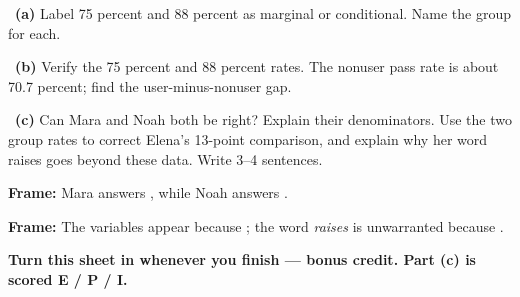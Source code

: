 \documentclass[11pt]{article}
\begin{document}
~\textbf{(a)} Label 75 percent and 88 percent as marginal or conditional. Name the group for each.\par
\workspace{0.7in}

~\textbf{(b)} Verify the 75 percent and 88 percent rates. The nonuser pass rate is about 70.7 percent; find the user-minus-nonuser gap.\par
\workspace{1.4in}

~\textbf{(c)} Can Mara and Noah both be right? Explain their denominators. Use the two group rates to correct Elena's 13-point comparison, and explain why her word raises goes beyond these data. Write 3--4 sentences.\par
\workspace{2.0in}

\begin{sentenceframebox}\raggedright\textbf{Frame:} Mara answers \blank[2.1in], while Noah answers \blank[2.1in].\end{sentenceframebox}

\begin{sentenceframebox}\raggedright\textbf{Frame:} The variables appear \blank[0.8in] because \blank[2.1in]; the word \emph{raises} is unwarranted because \blank[2.0in].\end{sentenceframebox}

\textbf{Turn this sheet in whenever you finish --- bonus credit. Part (c) is scored E / P / I.}\par
\end{document}

